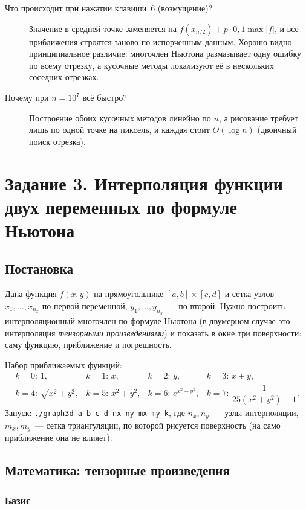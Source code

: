 \documentclass[11pt,a4paper]{report}
\begin{document}
\begin{description}
\item[Что происходит при нажатии клавиши~6 (возмущение)?] Значение в средней
точке заменяется на $f(x_{n/2})+p\cdot0{,}1\max|f|$, и все приближения строятся
заново по испорченным данным. Хорошо видно принципиальное различие: многочлен
Ньютона размазывает одну ошибку по всему отрезку, а кусочные методы
локализуют её в нескольких соседних отрезках.

\item[Почему при $n=10^7$ всё быстро?] Построение обоих кусочных методов
линейно по $n$, а рисование требует лишь по одной точке на пиксель, и каждая
стоит $O(\log n)$ (двоичный поиск отрезка).
\end{description}

\chapter{Задание 3. Интерполяция функции двух переменных по формуле Ньютона}
\label{ch:task3}

\section{Постановка}

Дана функция $f(x,y)$ на прямоугольнике $[a,b]\times[c,d]$ и сетка узлов
$x_1,\dots,x_{n_x}$ по первой переменной, $y_1,\dots,y_{n_y}$~--- по второй.
Нужно построить интерполяционный многочлен по формуле Ньютона (в двумерном
случае это интерполяция \emph{тензорными произведениями}) и показать в окне три
поверхности: саму функцию, приближение и погрешность.

Набор приближаемых функций:
\[
\begin{array}{llll}
k=0:\,1, & k=1:\,x, & k=2:\,y, & k=3:\,x+y,\\[2pt]
k=4:\,\sqrt{x^2+y^2}, & k=5:\,x^2+y^2, & k=6:\,e^{x^2-y^2}, &
k=7:\,\dfrac{1}{25(x^2+y^2)+1}.
\end{array}
\]
Запуск: \texttt{./graph3d a b c d nx ny mx my k}, где $n_x,n_y$~--- узлы
интерполяции, $m_x,m_y$~--- сетка триангуляции, по которой рисуется
поверхность (на само приближение она не влияет).

\section{Математика: тензорные произведения}

\subsection{Базис}
\end{document}
